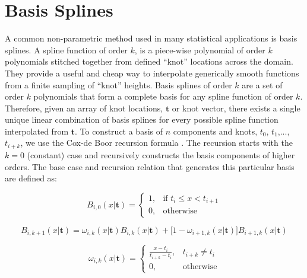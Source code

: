 \appendix
\section{Basis Splines} \label{sec:basis_splines}

A common non-parametric method used in many statistical applications is basis splines. A spline function of order $k$, 
is a piece-wise polynomial of order $k$ polynomials stitched together from defined ``knot'' locations across the domain. 
They provide a useful and cheap way to interpolate generically smooth functions from a finite sampling of ``knot'' heights. 
Basis splines of order $k$ are a set of order $k$ polynomials that form a complete basis for any spline function of order $k$. 
Therefore, given an array of knot locations, $\mathbf{t}$ or knot vector, there exists a single unique linear combination of basis splines 
for every possible spline function interpolated from $\mathbf{t}$. To construct a basis of $n$ components and knots, $t_0$, $t_1$,...,$t_{i+k}$, 
we use the Cox-de Boor recursion formula \citep{deBoor78,monotone_regression_splines}. The recursion starts with the $k=0$ (constant) case and recursively constructs 
the basis components of higher orders. The base case and recursion relation that generates this particular basis are defined as:

\begin{equation}
    B_{i,0}(x | \mathbf{t}) = 
    \begin{cases}
        1, & \text{if } t_i \leq x < t_{i+1} \\
        0, & \text{otherwise}
    \end{cases}
\end{equation}

\begin{equation}
    B_{i,k+1}(x | \mathbf{t}) = \omega_{i,k}(x | \mathbf{t})B_{i,k}(x | \mathbf{t}) + \big[1-\omega_{i+1,k}(x | \mathbf{t})\big] B_{i+1,k}(x | \mathbf{t})
\end{equation}

\begin{equation}
    \omega_{i,k}(x | \mathbf{t}) =
    \begin{cases}
        \frac{x-t_i}{t_{i+k}-t_i}, & t_{i+k} \neq t_i \\
        0, & \text{otherwise}
    \end{cases}
\end{equation}

